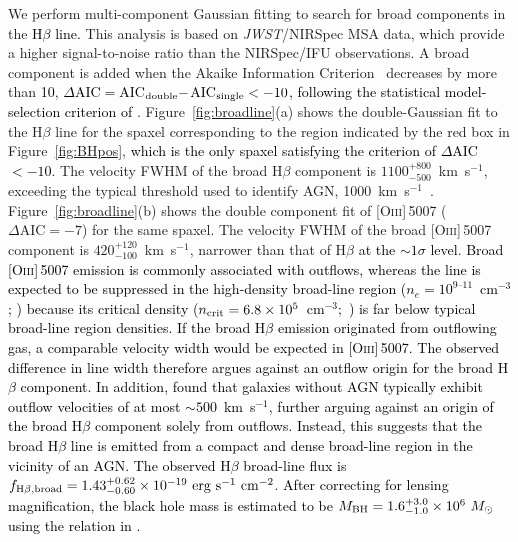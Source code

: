 \documentclass[trackchanges,twocolumn]{aastex701}
\newcommand{\ca}[1]{\textcolor{black}{#1}} %
\newcommand{\cb}[1]{\textcolor{black}{#1}} %
\newcommand{\cc}[1]{\textcolor{black}{#1}} %
\newcommand{\cd}[1]{\textcolor{black}{#1}} %
\newcommand{\cf}[1]{\textcolor{black}{#1}} %
\newcommand{\ck}[1]{\textcolor{black}{#1}}
\newcommand{\cl}[1]{\textcolor{black}{#1}}
\newcommand{\cn}[1]{\textcolor{black}{#1}}
\newcommand{\co}[1]{\textcolor{black}{#1}}
\begin{document}
We perform multi-component Gaussian fitting to search for broad components in the \ck{H$\beta$ line.} %
This analysis is based on \textit{JWST}/NIRSpec MSA data, which provide a higher signal-to-noise ratio than the NIRSpec/IFU observations. 
A broad component is added when the Akaike Information Criterion~\ca{\citep[\cc{AIC;}][]{Akaike1974}} decreases by more than \cb{10}, \cn{$\Delta$AIC$=$AIC$_{\rm double}-$AIC$_{\rm single}<-10$}\ck{, following the statistical model-selection criterion of \citet{Burnham2004}}. 
Figure~\ref{fig:broadline}(a) shows the double-Gaussian fit to the H$\beta$ line for the spaxel corresponding to the region indicated by the red box in Figure~\ref{fig:BHpos}, \cl{which is the only spaxel satisfying the criterion of $\Delta$AIC$<-10$}. The velocity FWHM of the broad H$\beta$ component is $1100^{+800}_{-500}$~km~s$^{-1}$, exceeding the typical threshold used to identify AGN, 1000~km~s$^{-1}$~\citep[e.g.,][]{Harikane2023b,Mathee2024,Kiyota2025}.
Figure~\ref{fig:broadline}(b) shows the double component fit of [\textsc{Oiii}]\,5007 ($\Delta \mathrm{AIC}=-7$) for the same spaxel. The velocity FWHM of the broad [\textsc{Oiii}]\,5007 component is $420^{+120}_{-100}$~km~s$^{-1}$, narrower than that of H$\beta$ \co{at the $\sim1\sigma$ level}. \cf{Broad [\textsc{Oiii}]\,5007 emission is commonly associated with outflows, whereas the line is expected to be suppressed in the high-density broad-line region ($n_e=10^{9\textrm{--}11}$~cm$^{-3}$; \citealt{Osterbrock1986}) because its critical density ($n_{\rm crit}=6.8\times10^5$~cm$^{-3}$;~\citealt{Osterbrock2006}) is far below typical broad-line region densities. If the broad H$\beta$ emission originated from outflowing gas, a comparable velocity width would be expected in [\textsc{Oiii}]\,5007. The observed difference in line width therefore argues against an outflow origin for the broad H$\beta$ component.} 
\cn{In addition, \citet{Xu2025} found that galaxies without AGN typically exhibit outflow velocities of at most $\sim500$~km~s$^{-1}$, further arguing against an origin of the broad H$\beta$ component solely from outflows.} 
\cb{Instead, this suggests that the broad H$\beta$ line is emitted from a compact and dense broad-line region in the vicinity of an AGN.} \cd{The \cn{observed} H$\beta$ broad-line flux is $f_{\rm H\beta,broad} = 1.43^{+0.62}_{-0.60}\times10^{-19}~\mathrm{erg~s^{-1}~cm^{-2}}$}. \ca{\cn{After correcting for lensing magnification,} the black hole mass is estimated to be \cn{$M_{\rm BH} = 1.6^{+3.0}_{-1.0} \times 10^6~M_\odot$} using the relation in \citet{Greene2005}.} 
\end{document}
